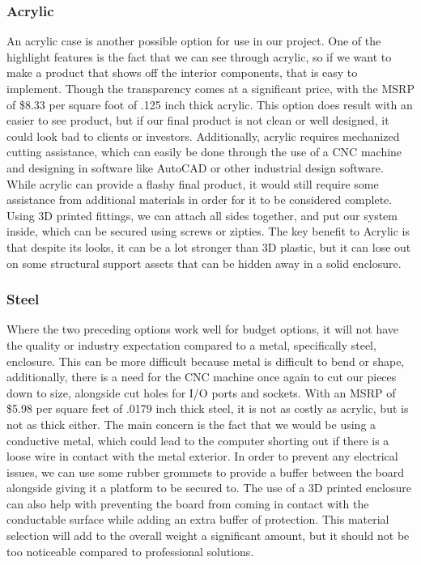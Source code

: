 \documentclass[onecolumn, draftclsnofoot,10pt, compsoc]{IEEEtran}
\begin{document}
        \subsubsection{Acrylic}
        An acrylic case is another possible option for use in our project. One of the highlight features is the fact that we can see through acrylic, so if we want to make a product that shows off the interior components, that is easy to implement. Though the transparency comes at a significant price, with the MSRP of \$8.33 per square foot of .125 inch thick acrylic\cite{e3}. This option does result with an easier to see product, but if our final product is not clean or well designed, it could look bad to clients or investors. Additionally, acrylic requires mechanized cutting assistance, which can easily be done through the use of a CNC machine and designing in software like AutoCAD or other industrial design software. While acrylic can provide a flashy final product, it would still require some assistance from additional materials in order for it to be considered complete. Using 3D printed fittings, we can attach all sides together, and put our system inside, which can be secured using screws or zipties. The key benefit to Acrylic is that despite its looks, it can be a lot stronger than 3D plastic\cite{e4}, but it can lose out on some structural support assets that can be hidden away in a solid enclosure.
        
        \subsubsection{Steel}
        Where the two preceding options work well for budget options, it will not have the quality or industry expectation compared to a metal, specifically steel, enclosure. This can be more difficult because metal is difficult to bend or shape, additionally, there is a need for the CNC machine once again to cut our pieces down to size, alongside cut holes for I/O ports and sockets. With an MSRP of \$5.98 per square feet of .0179 inch thick steel\cite{e5}, it is not as costly as acrylic, but is not as thick either. The main concern is the fact that we would be using a conductive metal, which could lead to the computer shorting out if there is a loose wire in contact with the metal exterior. In order to prevent any electrical issues, we can use some rubber grommets to provide a buffer between the board alongside giving it a platform to be secured to. The use of a 3D printed enclosure can also help with preventing the board from coming in contact with the conductable surface while adding an extra buffer of protection. This material selection will add to the overall weight a significant amount, but it should not be too noticeable compared to professional solutions.
\end{document}
